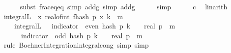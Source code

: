 \begin{isabellebody}
\ \ \ \ \isamarkupfalse%
\ {\isacharparenleft}{\kern0pt}subst\ frac{\isacharunderscore}{\kern0pt}eq{\isacharunderscore}{\kern0pt}eq{\isacharcomma}{\kern0pt}\ simp\ add{\isacharcolon}{\kern0pt}g{\isacharcomma}{\kern0pt}\ simp\ add{\isacharcolon}{\kern0pt}g{\isacharparenright}{\kern0pt}\isanewline
\ \ \ \ \isamarkupfalse%
\ {\isacharparenleft}{\kern0pt}simp{\isacharparenright}{\kern0pt}\isanewline
\ \ \ \ \isamarkupfalse%
\ c{\isacharunderscore}{\kern0pt}{}\ \isamarkupfalse%
\ linarith\isanewline
\isanewline
\ \ \isamarkupfalse%
\ {\isachardoublequoteopen}integral\isactrlsup L\ {\isasymOmega}\ {\isacharparenleft}{\kern0pt}{\isasymlambda}x{\isachardot}{\kern0pt}\ real{\isacharunderscore}{\kern0pt}of{\isacharunderscore}{\kern0pt}int\ {\isacharparenleft}{\kern0pt}f{}{\isacharunderscore}{\kern0pt}hash\ p\ x\ k{\isacharparenright}{\kern0pt}\ {\isacharcircum}{\kern0pt}\ m{\isacharparenright}{\kern0pt}\ {\isacharequal}{\kern0pt}\isanewline
\ \ \ \ integral\isactrlsup L\ {\isasymOmega}\ {\isacharparenleft}{\kern0pt}{\isasymlambda}{\isasymomega}{\isachardot}{\kern0pt}\ indicator\ {\isacharbraceleft}{\kern0pt}{\isasymomega}{\isachardot}{\kern0pt}\ even\ {\isacharparenleft}{\kern0pt}hash\ p\ k\ {\isasymomega}{\isacharparenright}{\kern0pt}{\isacharbraceright}{\kern0pt}\ {\isasymomega}\ {\isacharasterisk}{\kern0pt}\ {\isacharparenleft}{\kern0pt}real\ p\ {\isacharminus}{\kern0pt}\ {}{\isacharparenright}{\kern0pt}{\isacharcircum}{\kern0pt}m\ {\isacharplus}{\kern0pt}\ \isanewline
\ \ \ \ \ \ indicator\ {\isacharbraceleft}{\kern0pt}{\isasymomega}{\isachardot}{\kern0pt}\ odd\ {\isacharparenleft}{\kern0pt}hash\ p\ k\ {\isasymomega}{\isacharparenright}{\kern0pt}{\isacharbraceright}{\kern0pt}\ {\isasymomega}\ {\isacharasterisk}{\kern0pt}\ {\isacharparenleft}{\kern0pt}{\isacharminus}{\kern0pt}real\ p\ {\isacharminus}{\kern0pt}\ {}{\isacharparenright}{\kern0pt}{\isacharcircum}{\kern0pt}m{\isacharparenright}{\kern0pt}{\isachardoublequoteclose}\ \isanewline
\ \ \ \ \isamarkupfalse%
\ {\isacharparenleft}{\kern0pt}rule\ Bochner{\isacharunderscore}{\kern0pt}Integration{\isachardot}{\kern0pt}integral{\isacharunderscore}{\kern0pt}cong{\isacharcomma}{\kern0pt}\ simp{\isacharcomma}{\kern0pt}\ simp{\isacharparenright}{\kern0pt}\isanewline
\ \ \isamarkupfalse%
\ \isamarkupfalse%
\ {\isachardoublequoteopen}{\isachardot}{\kern0pt}{\isachardot}{\kern0pt}{\isachardot}{\kern0pt}\ {\isacharequal}{\kern0pt}\ \isanewline

\end{isabellebody}
